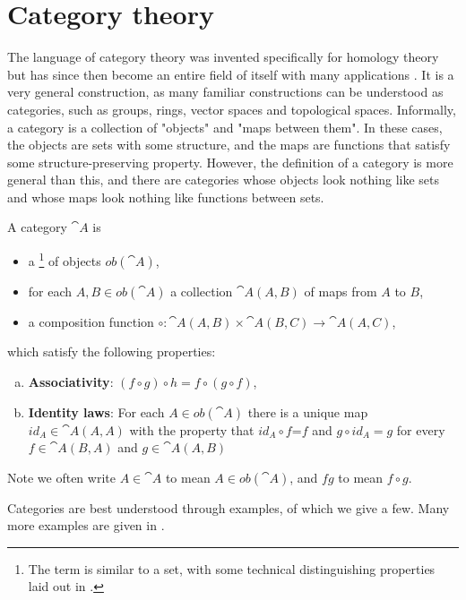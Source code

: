 \section{Category theory}\label{sec-category-theory}
The language of category theory was invented specifically for homology theory but has since then become an entire field of itself with many applications \cite{Marquis}. It is a very general construction, as many familiar constructions can be understood as categories, such as groups, rings, vector spaces and topological spaces. Informally, a category is a collection of "objects" and "maps between them". In these cases, the objects are sets with some structure, and the maps are functions that satisfy some structure-preserving property. However, the definition of a category is more general than this, and there are categories whose objects look nothing like sets and whose maps look nothing like functions between sets.

\begin{definition}
A category $\cat{A}$ is
\begin{itemize}
    \item a \footnote{The term  is similar to a set, with some technical distinguishing properties laid out in \cite{Leinster}.} of objects $ob(\cat{A})$,
    \item for each $A,B\in ob(\cat{A})$ a collection $\cat{A}(A,B)$ of maps from $A$ to $B$,
    \item a composition function $\circ:\cat{A}(A,B)\times \cat{A}(B,C)\rightarrow \cat{A}(A,C)$,
\end{itemize}
which satisfy the following properties:

\begin{enumerate}[(a)]
\item \textbf{Associativity}: $(f\circ g)\circ h=f\circ(g\circ f)$,
\item \textbf{Identity laws}: For each $A\in ob(\cat{A})$ there is a unique map $id_A\in \cat{A}(A,A)$ with the property that $id_A\circ f$=$f$ and $g\circ id_A=g$ for every $f\in \cat{A}(B,A)$ and $g\in \cat{A}(A,B)$
\end{enumerate}
\end{definition}
Note we often write $A\in \cat{A}$ to mean $A\in ob(\cat{A})$, and $fg$ to mean $f\circ g$.
\par Categories are best understood through examples, of which we give a few. Many more examples are given in \cite{Leinster}.

